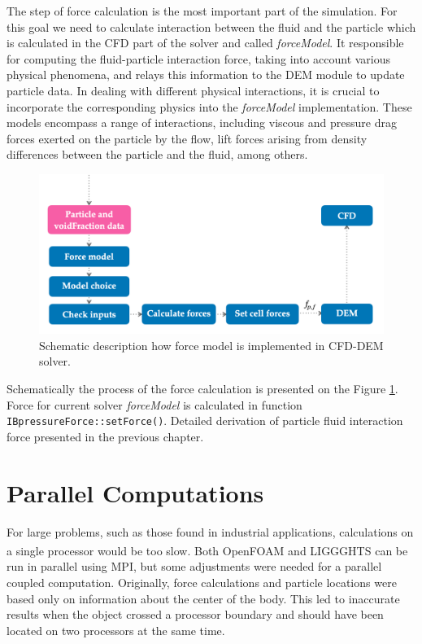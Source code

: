 The step of force calculation is the most important part of the simulation. For this goal we need to calculate interaction between the fluid and the particle which is calculated in the CFD part of the solver and called \textit{forceModel}. It responsible for computing the fluid-particle interaction force, taking into account various physical phenomena, and relays this information to the DEM module to update particle data. In dealing with different physical interactions, it is crucial to incorporate the corresponding physics into the \textit{forceModel} implementation. These models encompass a range of interactions, including viscous and pressure drag forces exerted on the particle by the flow, lift forces arising from density differences between the particle and the fluid, among others. 

\begin{figure}[!ht]
    \centering
    \includegraphics[width=15cm]{GWU_Thesis_Sarmakeeva/Images/chap3/force_model.png}
    \caption{Schematic description how force model is implemented in CFD-DEM solver.}
    \label{fig:force-model}
\end{figure}
Schematically the process of the force calculation is presented on the Figure \ref{fig:force-model}. Force for current solver \textit{forceModel} is calculated in function \verb|IBpressureForce::setForce()|. Detailed derivation of particle fluid interaction force presented in the previous chapter. 


\section{Parallel Computations}

For large problems, such as those found in industrial applications, calculations on a single processor would be too slow. Both OpenFOAM\textsuperscript{\textregistered} and LIGGGHTS\textsuperscript{\textregistered} can be run in parallel using MPI, but some adjustments were needed for a parallel coupled computation. Originally, force calculations and particle locations were based only on information about the center of the body. This led to inaccurate results when the object crossed a processor boundary and should have been located on two processors at the same time.

